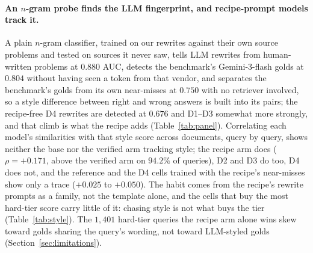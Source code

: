 \paragraph{An $n$-gram probe finds the LLM fingerprint, and recipe-prompt models track it.}
A plain $n$-gram classifier, trained on our rewrites against their own source problems and tested on sources it never saw, tells LLM rewrites from human-written problems at $0.880$ AUC, detects the benchmark's Gemini-3-flash golds at $0.804$ without having seen a token from that vendor, and separates the benchmark's golds from its own near-misses at $0.750$ with no retriever involved, so a style difference between right and wrong answers is built into its pairs; the recipe-free D4 rewrites are detected at $0.676$ and D1--D3 somewhat more strongly, and that climb is what the recipe adds (Table~\ref{tab:panel}). Correlating each model's similarities with that style score across documents, query by query, shows neither the base nor the verified arm tracking style; the recipe arm does ($\rho = +0.171$, above the verified arm on $94.2\%$ of queries), D2 and D3 do too, D4 does not, and the reference and the D4 cells trained with the recipe's near-misses show only a trace ($+0.025$ to $+0.050$). The habit comes from the recipe's rewrite prompts as a family, not the template alone, and the cells that buy the most hard-tier score carry little of it: chasing style is not what buys the tier (Table~\ref{tab:style}). The $1{,}401$ hard-tier queries the recipe arm alone wins skew toward golds sharing the query's wording, not toward LLM-styled golds (Section~\ref{sec:limitations}).
